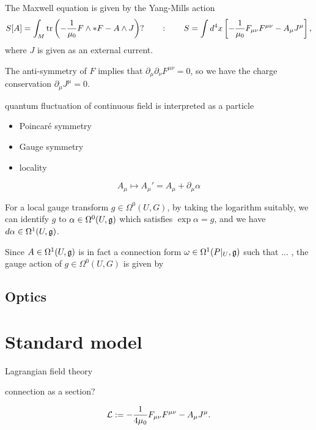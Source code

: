 \documentclass{../../large}
\begin{document}
The Maxwell equation is given by the Yang-Mills action
\[S[A]=\int_M\operatorname{tr}\left(-\frac1{\mu_0}F\wedge*F-A\wedge J\right)?\qquad:\qquad S=\int d^4x\left[-\frac1{\mu_0}F_{\mu\nu}F^{\mu\nu}-A_\mu J^\mu\right],\]
where $J$ is given as an external current.


The anti-symmetry of $F$ implies that $\partial_\mu\partial_\nu F^{\mu\nu}=0$, so we have the charge conservation $\partial_\mu J^\mu=0$.

quantum fluctuation of continuous field is interpreted as a particle

\begin{itemize}
\item Poincar\'e symmetry
\item Gauge symmetry
\item locality
\end{itemize}


\[A_\mu\mapsto A_\mu'=A_\mu+\partial_\mu\alpha\]

For a local gauge transform $g\in\Omega^0(U,G)$, by taking the logarithm suitably, we can identify $g$ to $\alpha\in\Omega^0(U,\mathfrak{g})$ which satisfies $\exp\alpha=g$, and we have $d\alpha\in\Omega^1(U,\mathfrak{g})$.

Since $A\in\Omega^1(U,\mathfrak{g})$ is in fact a connection form $\omega\in\Omega^1(P|_U,\mathfrak{g})$ such that ... , the gauge action of $g\in\Omega^0(U,G)$ is given by

\section{Optics}



\chapter{Standard model}


Lagrangian field theory

connection as a section?


\begin{prb}
\end{prb}

\[\mathcal{L}:=-\frac1{4\mu_0}F_{\mu\nu}F^{\mu\nu}-A_\mu J^\mu.\]
\end{document}
